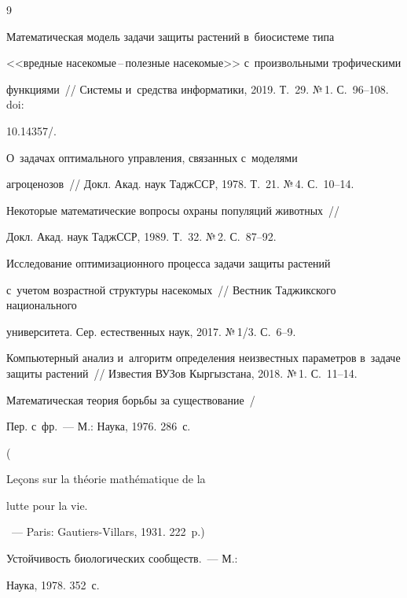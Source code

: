 {\small\frenchspacing


{%




\begin{thebibliography}{9}




   Математическая модель задачи защиты растений в~биосистеме типа 


<<вредные на\-се\-ко\-мые\,--\,по\-лез\-ные насекомые>> с~произвольными трофическими 


функциями~/\!\!/ Сис\-те\-мы и~средства информатики, 2019. Т.~29. №\,1. С.~96--108. doi: 


10.14357\!/.







 О~задачах оптимального управления, связанных с~моделями 


агроценозов~/\!\!/ Докл. Акад. наук ТаджССР, 1978. Т.~21. №\,4. С.~10--14.




 Некоторые математические вопросы охраны популяций животных~/\!\!/ 


Докл. Акад. наук ТаджССР, 1989. Т.~32. №\,2. С.~87--92.




 Исследование оптимизационного процесса задачи защиты растений 


с~учетом возрастной структуры насекомых~/\!\!/ Вестник Таджикского национального 


университета. Сер. естественных наук, 2017. №\,1/3. С.~6--9.




 Компьютерный анализ и~алгоритм определения неизвестных параметров в~задаче защиты растений~/\!\!/ Известия ВУЗов Кыргызстана, 2018. №\,1. С.~11--14.









Математическая теория борьбы за существование~/


Пер. с~фр.~--- М.: Наука, 1976. 286~с.


(  {\mbox{Le\c{c}ons} sur la th\'{e}orie math\'{e}matique de la


lutte pour la vie.}~--- Paris: Gautiers-Villars, 1931. 222~p.)







 Устойчивость биологических сообществ.~--- М.: 


Наука, 1978. 352~с.


 \end{thebibliography}


} }
